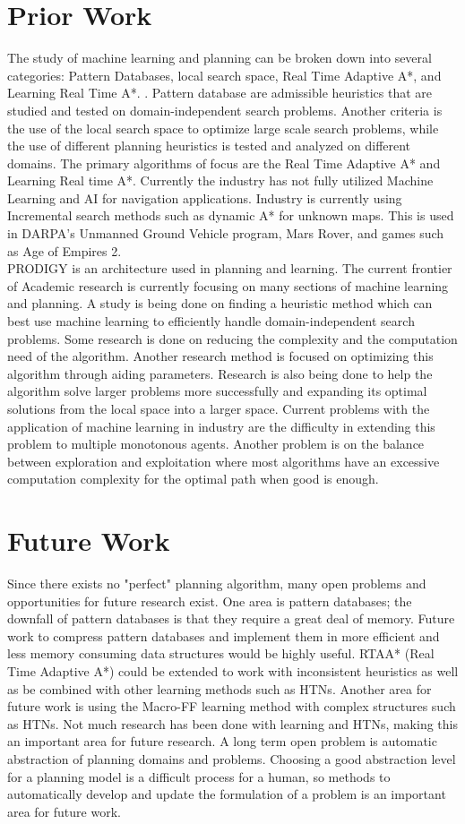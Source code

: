 \documentclass[tog]{acmsiggraph}
\begin{document}
\section{Prior Work}
\indent The study of machine learning and planning can be broken down into several categories: Pattern Databases, local search space, Real Time Adaptive A*, and Learning Real Time A*. . Pattern database are admissible heuristics that are studied and tested on domain-independent search problems. Another criteria is the use of the local search space to optimize large scale search problems, while the use of different planning heuristics is tested and analyzed on different domains. The primary algorithms of focus are the Real Time Adaptive A* and Learning Real time A*. Currently the industry has not fully utilized Machine Learning and AI for navigation applications. Industry is currently using Incremental search methods such as dynamic A* for unknown maps. This is used in DARPA’s Unmanned Ground Vehicle program, Mars Rover, and games such as Age of Empires 2. 
\\
\indent PRODIGY is an architecture used in planning and learning. The current frontier of Academic research is currently focusing on many sections of machine learning and planning. A study is being done on finding a heuristic method which can best use machine learning to efficiently handle domain-independent search problems. Some research is done on reducing the complexity and the computation need of the algorithm. Another research method is focused on optimizing this algorithm through aiding parameters. Research is also being done to help the algorithm solve larger problems more successfully and expanding its optimal solutions from the local space into a larger space. Current problems with the application of machine learning in industry are the difficulty in extending this problem to multiple monotonous agents. Another problem is on the balance between exploration and exploitation where most algorithms have an excessive computation complexity for the optimal path when good is enough.
\section{Future Work}
\indent Since there exists no "perfect" planning algorithm, many open problems and opportunities for future research exist. One area is pattern databases; the downfall of pattern databases is that they require a great deal of memory. Future work to compress pattern databases and implement them in more efficient and less memory consuming data structures would be highly useful. RTAA* (Real Time Adaptive A*) could be extended to work with inconsistent heuristics as well as be combined with other learning methods such as HTNs. Another area for future work is using the Macro-FF learning method with complex structures such as HTNs. Not much research has been done with learning and HTNs, making this an important area for future research. A long term open problem is automatic abstraction of planning domains and problems. Choosing a good abstraction level for a planning model is a difficult process for a human, so methods to automatically develop and update the formulation of a problem is an important area for future work.

\end{document}
